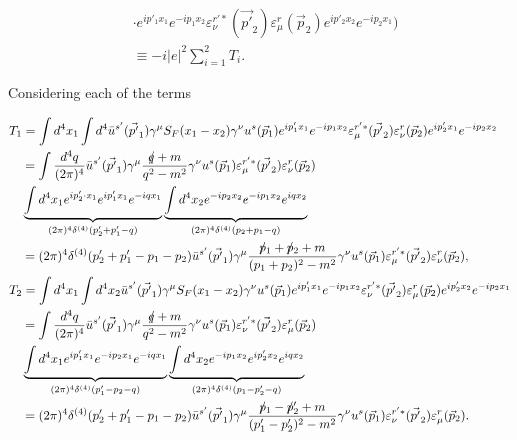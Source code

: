 \begin{example}
\begin{footnotesize}
\begin{equation}
\begin{split}
			&\cdot e^{ip'_1 x_1}e^{-ip_1x_2}
			\varepsilon_\nu^{r'*}(\vec{p'}_2)\varepsilon_\mu^{r}(\vec{p}_2)e^{ip'_2x_2}e^{-ip_2 x_1}\bigg)\\
			&\equiv-i|e|^2\sum_{i=1}^{2}T_i.
		\end{split}
		\label{t2}
	\end{equation} 
\end{footnotesize}	
	Considering each of the terms
	\begin{footnotesize}
	 \begin{equation}
		\begin{split}
			&T_1=\int d^4x_1\int d^4
			\bar{u}^{s'}(\vec{p'}_1)\gamma^\mu S_{F}(x_1-x_2)\gamma^\nu u^s(\vec{p}_1)e^{ip'_1 x_1}e^{-ip_1 x_2}\varepsilon_\mu^{r'*}(\vec{p'}_2)\varepsilon_\nu^{r}(\vec{p}_2)e^{ip'_2 x_1}e^{-ip_2 x_2}\\
			&\quad=\int \frac{d^4q}{(2\pi)^4}
			\bar{u}^{s'}(\vec{p'}_1)\gamma^\mu \frac{\slashed q+m}{q^2-m^2}\gamma^\nu u^s(\vec{p}_1)\varepsilon_\mu^{r'*}(\vec{p'}_2)\varepsilon_\nu^{r}(\vec{p}_2)\\
			&\quad\underbrace{\int d^4x_1
				e^{ip'_2\cdot x_1}e^{ip'_1 x_1}e^{-iq x_1}}_{(2\pi)^4\delta^{(4)}(p'_2+p'_1-q)}\underbrace{\int d^4x_2
				e^{-ip_2 x_2}
				e^{-ip_1x_2}e^{iq x_2}}_{(2\pi)^4\delta^{(4)}(p_2+p_1-q)}\\
			&\quad=(2\pi)^4\delta^{(4)}(p'_2+p'_1-p_1-p_2)\bar{u}^{s'}(\vec{p'}_1)\gamma^\mu \frac{\slashed p_1+\slashed p_2+m}{(p_1+p_2)^2-m^2}\gamma^\nu u^s(\vec{p}_1)\varepsilon_\mu^{r'*}(\vec{p'}_2)\varepsilon_\nu^{r}(\vec{p}_2),\\
			&T_2=\int d^4x_1\int d^4x_2
			\bar{u}^{s'}(\vec{p'}_1)\gamma^\mu S_{F}(x_1-x_2)\gamma^\nu u^s(\vec{p}_1)e^{ip'_1 x_1}e^{-ip_1 x_2}
			\varepsilon_\nu^{r'*}(\vec{p'}_2)\varepsilon_\mu^{r}(\vec{p}_2)e^{ip'_2 x_2}e^{-ip_2 x_1}\\
			&\quad=\int \frac{d^4q}{(2\pi)^4}
			\bar{u}^{s'}(\vec{p'}_1)\gamma^\mu \frac{\slashed q+m}{q^2-m^2}\gamma^\nu u^s(\vec{p}_1)
			\varepsilon_\nu^{r'*}(\vec{p'}_2)\varepsilon_\mu^{r}(\vec{p}_2)\\
			&\quad\underbrace{\int d^4x_1
				e^{ip'_1 x_1}e^{-ip_2 x_1}e^{-iqx_1}}_{(2\pi)^4\delta^{(4)}(p'_1-p_2-q)}\underbrace{\int d^4x_2e^{-ip_1 x_2}
				e^{ip'_2 x_2}e^{iq x_2}}_{(2\pi)^4\delta^{(4)}(p_1-p'_2-q)}\\
			&\quad=(2\pi)^4\delta^{(4)}(p'_2+p'_1-p_1-p_2)\bar{u}^{s'}(\vec{p'}_1)\gamma^\mu \frac{\slashed p_1-\slashed p'_2+m}{(p'_1-p'_2)^2-m^2}\gamma^\nu u^s(\vec{p}_1)
			\varepsilon_\nu^{r'*}(\vec{p'}_2)\varepsilon_\mu^{r}(\vec{p}_2).

\end{split}
\end{equation}
\end{footnotesize}
\end{example}
